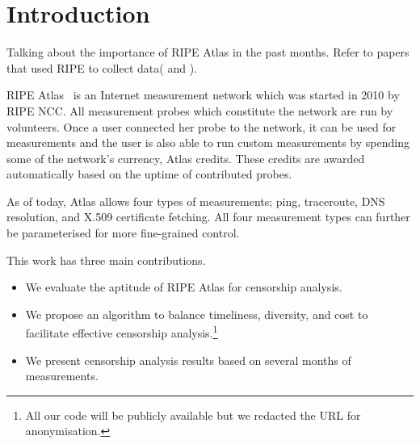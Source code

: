 \section{Introduction}

Talking about the importance of RIPE Atlas in the past months. Refer to papers that used RIPE to collect data(\cite{lutu2014understanding} and \cite{brownlee2014searching}).


RIPE Atlas~\cite{atlas} is an Internet measurement network which was started in 2010 by RIPE NCC.
All measurement probes which constitute the network are run by volunteers.  Once a user connected
her probe to the network, it can be used for measurements and the user is also able to run custom
measurements by spending some of the network's currency, Atlas credits.  These credits are awarded
automatically based on the uptime of contributed probes.

As of today, Atlas allows four types of measurements; ping, traceroute, DNS resolution, and X.509
certificate fetching.  All four measurement types can further be parameterised for more fine-grained
control.

This work has three main contributions.
\begin{itemize}
	\item We evaluate the aptitude of RIPE Atlas for censorship analysis.
	\item We propose an algorithm to balance
	timeliness, diversity, and cost to facilitate effective censorship analysis.\footnote{All our
	code will be publicly available but we redacted the URL for anonymisation.}
	\item We present censorship analysis results based on several months of measurements.
\end{itemize}

